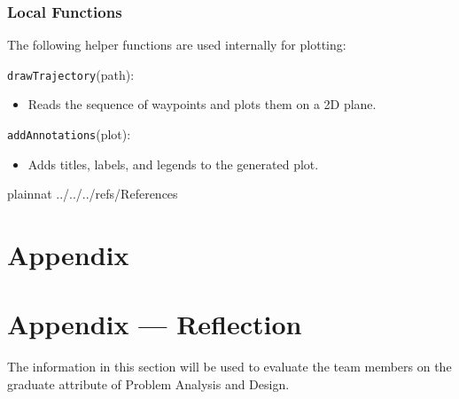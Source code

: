 \documentclass[12pt, titlepage]{article}
\begin{document}
\subsubsection{Local Functions}

The following helper functions are used internally for plotting:

\noindent \texttt{drawTrajectory}(path):
\begin{itemize}
    \item Reads the sequence of waypoints and plots them on a 2D plane.
\end{itemize}

\noindent \texttt{addAnnotations}(plot):
\begin{itemize}
    \item Adds titles, labels, and legends to the generated plot.
\end{itemize}

\newpage




\newpage
















 {plainnat}
 {../../../refs/References}

\newpage




\section{Appendix} \label{Appendix}


\newpage{}

\section*{Appendix --- Reflection}


The information in this section will be used to evaluate the team members on the
graduate attribute of Problem Analysis and Design.


\end{document}
